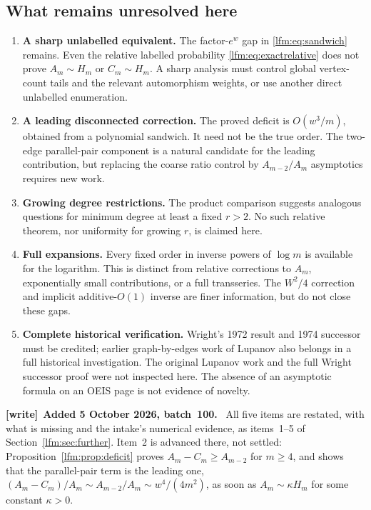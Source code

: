 \documentclass[11pt,letterpaper]{article}
\theoremstyle{remark}\newtheorem{remark}[theorem]{Remark}
\newenvironment{writenote}[1][]{\par\smallskip\begingroup\small
 \noindent\textbf{[write]}\if\relax\detokenize{#1}\relax\else~\textbf{#1.}\fi\ }%
 {\par\endgroup\smallskip}
\begin{document}
\subsection{What remains unresolved here}\label{lfm:sec:unresolved}
\begin{enumerate}
\item \textbf{A sharp unlabelled equivalent.} The factor-$e^w$ gap in \eqref{lfm:eq:sandwich} remains. Even the relative labelled probability \eqref{lfm:eq:exactrelative} does not prove $A_m\sim H_m$ or $C_m\sim H_m$. A sharp analysis must control global vertex-count tails and the relevant automorphism weights, or use another direct unlabelled enumeration.
\item \textbf{A leading disconnected correction.} The proved deficit is $O(w^3/m)$, obtained from a polynomial sandwich. It need not be the true order. The two-edge parallel-pair component is a natural candidate for the leading contribution, but replacing the coarse ratio control by $A_{m-2}/A_m$ asymptotics requires new work.
\item \textbf{Growing degree restrictions.} The product comparison suggests analogous questions for minimum degree at least a fixed $r>2$. No such relative theorem, nor uniformity for growing $r$, is claimed here.
\item \textbf{Full expansions.} Every fixed order in inverse powers of $\log m$ is available for the logarithm. This is distinct from relative corrections to $A_m$, exponentially small contributions, or a full transseries. The $W^2/4$ correction and implicit additive-$O(1)$ inverse are finer information, but do not close these gaps.
\item \textbf{Complete historical verification.} Wright's 1972 result and 1974 successor must be credited; earlier graph-by-edges work of Lupanov also belongs in a full historical investigation. The original Lupanov work and the full Wright successor proof were not inspected here. The absence of an asymptotic formula on an OEIS page is not evidence of novelty.
\end{enumerate}

\begin{writenote}[Added 5 October 2026, batch~100]
All five items are restated, with what is missing and the intake's
numerical evidence, as items~1--5 of Section~\ref{lfm:sec:further}. Item~2
is advanced there, not settled: Proposition~\ref{lfm:prop:deficit} proves
$A_m-C_m\ge A_{m-2}$ for $m\ge4$, and shows that the parallel-pair term is
the leading one, $(A_m-C_m)/A_m\sim A_{m-2}/A_m\sim w^4/(4m^2)$, as soon as
$A_m\sim\kappa H_m$ for some constant $\kappa>0$.
\end{writenote}
\end{document}
